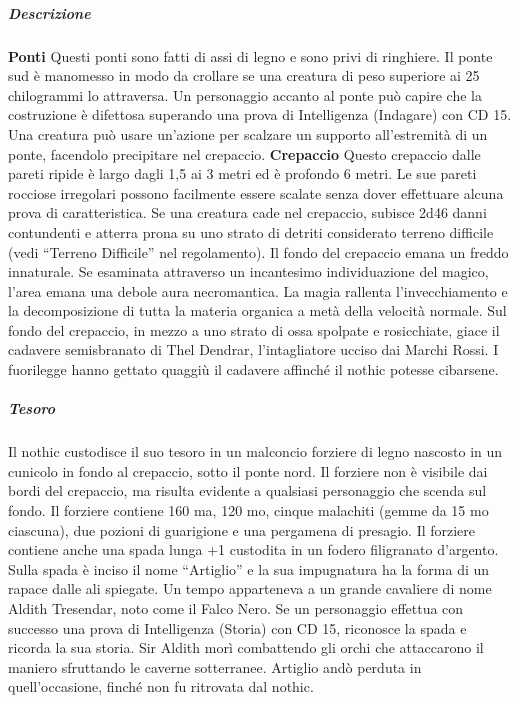 \documentclass{article}
\begin{document}
\begin{enumerate}
\subparagraph{Descrizione}
\textbf{Ponti} Questi ponti sono fatti di assi di legno e sono privi
di ringhiere. Il ponte sud è manomesso in modo da crollare se una creatura di peso superiore ai 25 chilogrammi lo
attraversa. Un personaggio accanto al ponte può capire che la
costruzione è difettosa superando una prova di Intelligenza
(Indagare) con CD 15. Una creatura può usare un'azione per
scalzare un supporto all'estremità di un ponte, facendolo
precipitare nel crepaccio. \newline
\textbf{Crepaccio} Questo crepaccio dalle pareti ripide è largo
dagli 1,5 ai 3 metri ed è profondo 6 metri. Le sue pareti
rocciose irregolari possono facilmente essere scalate senza
dover effettuare alcuna prova di caratteristica. Se una
creatura cade nel crepaccio, subisce 2d46 danni contundenti
e atterra prona su uno strato di detriti considerato terreno
difficile (vedi “Terreno Difficile” nel regolamento).
Il fondo del crepaccio emana un freddo innaturale. Se
esaminata attraverso un incantesimo individuazione del
magico, l’area emana una debole aura necromantica. La
magia rallenta l'invecchiamento e la decomposizione di tutta
la materia organica a metà della velocità normale.
Sul fondo del crepaccio, in mezzo a uno strato di ossa
spolpate e rosicchiate, giace il cadavere semisbranato di
Thel Dendrar, l'intagliatore ucciso dai Marchi Rossi. I
fuorilegge hanno gettato quaggiù il cadavere affinché il nothic
potesse cibarsene.
\subparagraph{Tesoro}Il nothic custodisce il suo tesoro in un malconcio forziere di
legno nascosto in un cunicolo in fondo al crepaccio, sotto il
ponte nord. Il forziere non è visibile dai bordi del crepaccio,
ma risulta evidente a qualsiasi personaggio che scenda sul
fondo. Il forziere contiene 160 ma, 120 mo, cinque malachiti
(gemme da 15 mo ciascuna), due pozioni di guarigione e una
pergamena di presagio. Il forziere contiene anche una spada lunga +1 custodita in
un fodero filigranato d’argento. Sulla spada è inciso il nome
“Artiglio” e la sua impugnatura ha la forma di un rapace dalle
ali spiegate. Un tempo apparteneva a un grande cavaliere
di nome Aldith Tresendar, noto come il Falco Nero. Se un
personaggio effettua con successo una prova di Intelligenza
(Storia) con CD 15, riconosce la spada e ricorda la sua storia.
Sir Aldith morì combattendo gli orchi che attaccarono il
maniero sfruttando le caverne sotterranee. Artiglio andò
perduta in quell’occasione, finché non fu ritrovata dal nothic.


\end{enumerate}
\end{document}
